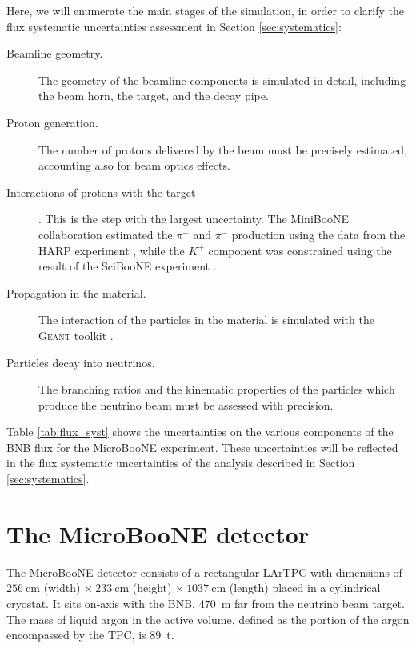 Here, we will enumerate the main stages of the simulation, in order to clarify the flux systematic uncertainties assessment in Section \ref{sec:systematics}:
\begin{description}
\item[Beamline geometry.] The geometry of the beamline components is simulated in detail, including the beam horn, the target, and the decay pipe. 
\item[Proton generation.] The number of protons delivered by the beam must be precisely estimated, accounting also for beam optics effects.
\item[Interactions of protons with the target]. This is the step with the largest uncertainty. The MiniBooNE collaboration estimated the $\pi^+$ and $\pi^-$ production using the data from the HARP experiment \cite{Catanesi:2005rc}, while the $K^+$ component was constrained using the result of the SciBooNE experiment \cite{Cheng:2011wq}. 
\item[Propagation in the material.] The interaction of the particles in the material is simulated with the \textsc{Geant} toolkit \cite{Brun:1994aa}.
\item[Particles decay into neutrinos.] The branching ratios and the kinematic properties of the particles which produce the neutrino beam must be assessed with precision.
\end{description}

Table \ref{tab:flux_syst} shows the uncertainties on the various components of the BNB flux for the MicroBooNE experiment. These uncertainties will be reflected in the flux systematic uncertainties of the analysis described in Section \ref{sec:systematics}.

\section{The MicroBooNE detector}\label{sec:detector}
The MicroBooNE detector consists of a rectangular LArTPC with dimensions of $256~$cm (width) $\times~233~$cm (height) $\times~1037~$cm (length) placed in a cylindrical cryostat. It sits on-axis with the BNB, 470~m far from the neutrino beam target. The mass of liquid argon in the active volume, defined as the portion of the argon encompassed by the TPC, is 89~t. 

